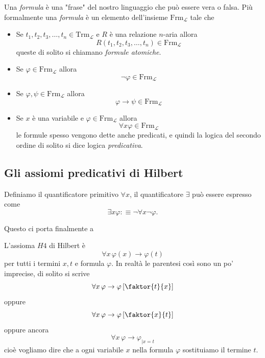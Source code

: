 \documentclass[11pt]{scrartcl}
\begin{document}
	\begin{definition}[Formula]
		Una \textit{formula} è una "frase" del nostro linguaggio che può essere vera o falsa. Più formalmente una \textit{formula} è un elemento dell'insieme $\text{Frm}_{\mathcal{L}}$ tale che
		\begin{itemize}
			\item Se $t_1,t_2,t_3,\dots,t_n\in \text{Trm}_{\mathcal{L}}$ e $R$ è una relazione $n$-aria allora 
			$$R(t_1,t_2,t_3,\dots,t_n)\in\text{Frm}_{\mathcal{L}}$$
			queste di solito si chiamano \textit{formule atomiche}.
			\item Se $\varphi\in \text{Frm}_{\mathcal{L}}$ allora 
			$$\lnot \varphi \in \text{Frm}_{\mathcal{L}}$$
			\item Se $\varphi,\psi\in \text{Frm}_{\mathcal{L}}$ allora
			$$\varphi\to\psi\in \text{Frm}_{\mathcal{L}}$$
			\item Se $x$ è una variabile e $\varphi\in \text{Frm}_\mathcal{L}$ allora
			$$\forall x \varphi \in\text{Frm}_\mathcal{L}$$
			le formule spesso vengono dette anche predicati, e quindi la logica del secondo ordine di solito si dice logica \textit{predicativa}.
		\end{itemize}
	\end{definition}
	\subsection{Gli assiomi predicativi di Hilbert}
	\begin{definition}[Quantificatori]
		Definiamo il quantificatore primitivo $\forall x$, il quantificatore $\exists$ può essere espresso come
		$$\exists x\varphi :\equiv \lnot \forall x\lnot \varphi.$$
	\end{definition}
	Questo ci porta finalmente a
	\begin{definition}
		L'assioma $H4$ di Hilbert è
		$$\forall x \, \varphi(x)\to \varphi(t)$$
		per tutti i termini $x,t$ e formula $\varphi$. In realtà le parentesi così sono un po' imprecise, di solito si scrive
		$$\forall x \, \varphi\to \varphi\left[\faktor{t}{x}\right]$$
		oppure 
		$$\forall x \, \varphi\to \varphi\left[\faktor{x}{t}\right]$$
		oppure ancora
		$$\forall x \, \varphi\to \varphi_{\mid x=t}$$
		cioè vogliamo dire che a ogni variabile $x$ nella formula $\varphi$ sostituiamo il termine $t$.
	\end{definition}
	
\end{document}
